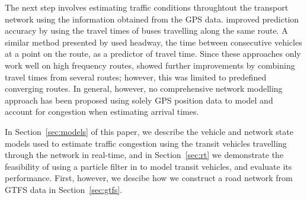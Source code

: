 The next step involves estimating traffic conditions throughtout the transport network
using the information obtained from the GPS data. 
\cite{Yu_2010} improved prediction accuracy by using the travel times
of buses travelling along the same route.
A similar method presented by \cite{Hans_2015}
used headway, the time between consecutive vehicles at a point on the route,
as a predictor of travel time.
Since these approaches only work well on high frequency routes,
\cite{Yu_2011} showed further improvements by combining travel times 
from several routes;
however, this was limited to predefined converging routes.
In general, however, no comprehensive network modelling approach has been proposed using
solely GPS position data to model and account for congestion when estimating arrival times.


In Section~\ref{sec:models} of this paper, 
we describe the \rt vehicle and network state models
used to estimate traffic congestion using the transit vehicles
travelling through the network in real-time,
and in Section~\ref{sec:rt} we demonstrate the feasibility of using a particle filter
in \rt to model transit vehicles,
and evaluate its performance.
First, however, we descibe how we construct a
road network from GTFS data in Section~\ref{sec:gtfs}.




